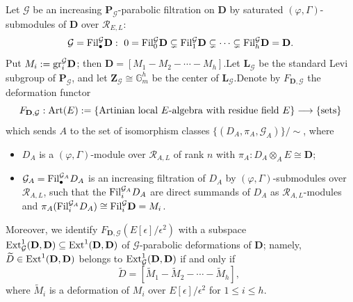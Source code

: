 \documentclass[10pt]{article}
\newcommand{\fil}{{\rm Fil}}
\newcommand{\ext}{{\rm Ext}}
\newcommand{\Art}{{\rm Art}}
\newcommand{\gr}{{\rm gr}}
\newcommand{\Dpik}{{\mathbf{D}}}
\newcommand{\BG}{{\mathbb{G}}}
\newcommand{\bL}{{\mathbf{L}}}
\newcommand{\bP}{{\mathbf{P}}}
\newcommand{\bZ}{{\mathbf{Z}}}
\newcommand{\cR}{\mathcal R}
\newcommand{\cG}{\mathcal G}
\begin{document}
Let $\cG$ be an increasing $\bP_{\cG}$-parabolic filtration on $\Dpik$ by saturated $(\varphi,\Gamma)$-submodules of $\Dpik$ over $\cR_{E,L}$:
\[\cG=\fil_{\bullet}^{\cG}\Dpik: \ 0 =\fil_0^{\cG}\Dpik \subsetneq \fil_1^{\cG}\Dpik \subsetneq \cdots \subsetneq \fil_{h}^{\cG} \Dpik=\Dpik.\]
Put $M_i:=\gr_i^{\cG}\Dpik$; then $\Dpik=[M_1-M_2-\cdots-M_h]$.\;Let $\bL_{\cG}$ be the standard Levi subgroup of $\bP_{\cG}$, and let $\bZ_{\cG}\cong \BG_m^h$ be the center of $\bL_{\cG}$.\;Denote by $F_{\Dpik,\cG}$ the deformation functor
\[F_{\Dpik,\cG} :\Art(E):=\{\text{Artinian local $E$-algebra with residue field $E$}\}\longrightarrow \{\text{sets}\}\]
which sends $A$ to the set of isomorphism classes $\{(D_A,\pi_A,\cG_A)\}/\sim$, where
\begin{itemize}
	\item[(1)] $D_A$ is a $(\varphi,\Gamma)$-module over $\cR_{A,L}$ of rank $n$ with $\pi_A:D_A\otimes_AE\cong \Dpik$;
	\item[(2)] $\cG_A=\fil^{\cG_A}_{\bullet}D_A$ is an increasing filtration of $D_A$ by $(\varphi,\Gamma)$-submodules over $\cR_{A,L}$, such that the $\fil^{\cG_A}_{i}D_A$ are direct summands of $D_A$ as $\cR_{A,L}$-modules and $\pi_A(\fil^{\cG_A}_{i}D_A)\cong \fil_{i}^{\cG} \Dpik=M_i$.
\end{itemize}
Moreover, we identify $F_{\Dpik,\cG}(E[\epsilon]/\epsilon^2)$ with a subspace $\ext^1_{\cG}(\Dpik,\Dpik)\subseteq \ext^1(\Dpik,\Dpik)$ of $\cG$-parabolic deformations of $\Dpik$; namely, $\widetilde{D}\in \ext^1(\Dpik,\Dpik)$ belongs to $\ext^1_{\cG}(\Dpik,\Dpik)$ if and only if 
\[\widetilde{D}=[\widetilde{M}_{1}-\widetilde{M}_{2}-\cdots-\widetilde{M}_{h}],\;\]
where $\widetilde{M}_{i}$ is a deformation of $M_{i}$ over $E[\epsilon]/\epsilon^2$ for $1\leq i\leq h$.\;
\end{document}
